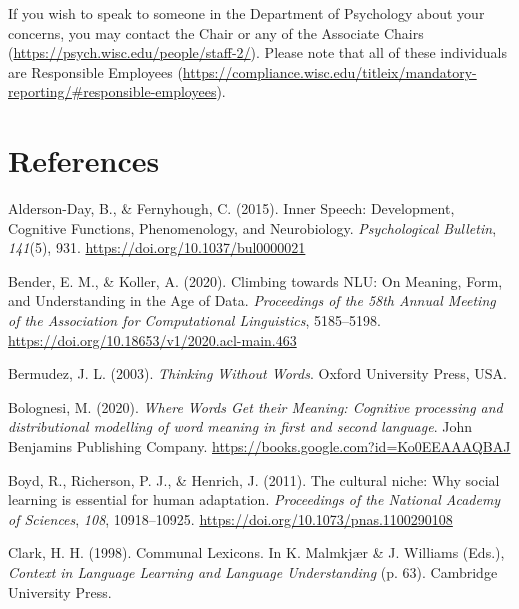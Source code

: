 \documentclass[11pt,man]{article}
\newenvironment{CSLReferences}%
  {}%
  {\par}
\begin{document}
If you wish to speak to someone in the Department of Psychology about
your concerns, you may contact the Chair or any of the Associate Chairs
(\url{https://psych.wisc.edu/people/staff-2/}). Please note that all of
these individuals are Responsible Employees
(\url{https://compliance.wisc.edu/titleix/mandatory-reporting/\#responsible-employees}).

\newpage

\hypertarget{references}{%
\section*{References}\label{references}}

\hypertarget{refs}{}
\begin{CSLReferences}{1}{0}
\leavevmode{}%
Alderson-Day, B., \& Fernyhough, C. (2015). Inner {Speech}:
{Development}, {Cognitive Functions}, {Phenomenology}, and
{Neurobiology}. \emph{Psychological Bulletin}, \emph{141}(5), 931.
\url{https://doi.org/10.1037/bul0000021}

\leavevmode{}%
Bender, E. M., \& Koller, A. (2020). Climbing towards {NLU}: {On
Meaning}, {Form}, and {Understanding} in the {Age} of {Data}.
\emph{Proceedings of the 58th {Annual Meeting} of the {Association} for
{Computational Linguistics}}, 5185--5198.
\url{https://doi.org/10.18653/v1/2020.acl-main.463}

\leavevmode{}%
Bermudez, J. L. (2003). \emph{Thinking {Without Words}}. {Oxford
University Press, USA}.

\leavevmode{}%
Bolognesi, M. (2020). \emph{Where {Words Get} their {Meaning}:
{Cognitive} processing and distributional modelling of word meaning in
first and second language}. {John Benjamins Publishing Company}.
\url{https://books.google.com?id=Ko0EEAAAQBAJ}

\leavevmode{}%
Boyd, R., Richerson, P. J., \& Henrich, J. (2011). The cultural niche:
{Why} social learning is essential for human adaptation.
\emph{Proceedings of the National Academy of Sciences}, \emph{108},
10918--10925. \url{https://doi.org/10.1073/pnas.1100290108}

\leavevmode{}%
Clark, H. H. (1998). Communal {Lexicons}. In K. Malmkjær \& J. Williams
(Eds.), \emph{Context in {Language Learning} and {Language
Understanding}} (p. 63). {Cambridge University Press}.


\end{CSLReferences}
\end{document}
